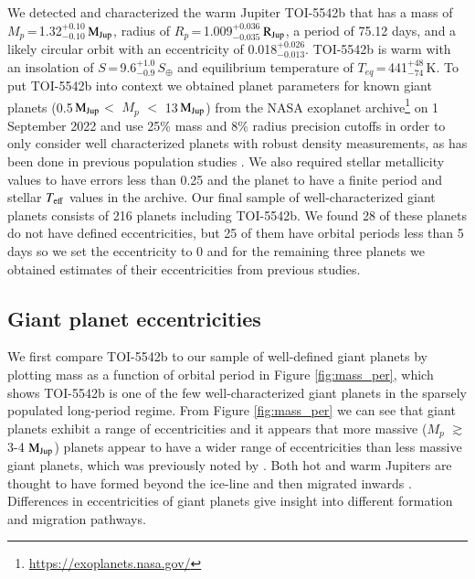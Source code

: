 \documentclass{aa}
\newcommand{\teff}{\ensuremath{T_{\rm eff}}\xspace}
\newcommand{\mjup}{\mbox{$\mathrm{M_{\rm Jup}}$}\xspace}
\newcommand{\rjup}{\mbox{$\mathrm{R_{\rm Jup}}$}\xspace}
\begin{document}
We detected and characterized the warm Jupiter TOI-5542b that has a mass of $M_p$\,=\,1.32$^{+0.10}_{-0.10}$\,\mjup, radius of $R_p$\,=\,1.009$^{+0.036}_{-0.035}$\,\rjup, a period of 75.12 days, and a likely circular orbit with an eccentricity of 0.018$^{+0.026}_{-0.013}$. TOI-5542b is warm with an insolation of $S$\,=\,9.6$^{+1.0}_{-0.9}$\,$S_{\oplus}$ and equilibrium temperature of $T_{eq}$\,=\,441$^{+48}_{-74}$\,K. To put TOI-5542b into context we obtained planet parameters for known giant planets (0.5\,\mjup $<$ $M_p$ $<$ 13\,\mjup) from the NASA exoplanet archive\footnote{\url{https://exoplanets.nasa.gov/}} on 1 September 2022 and use 25\% mass and 8\% radius precision cutoffs in order to only consider well characterized planets with robust density measurements, as has been done in previous population studies \citep[e.g.,][]{Otegi2020}. We also required stellar metallicity values to have errors less than 0.25 and the planet to have a finite period and stellar \teff values in the archive. Our final sample of well-characterized giant planets consists of 216 planets including TOI-5542b. We found 28 of these planets do not have defined eccentricities, but 25 of them have orbital periods less than 5 days so we set the eccentricity to 0 and for the remaining three planets we obtained estimates of their eccentricities from previous studies.

\subsection{Giant planet eccentricities}

We first compare TOI-5542b to our sample of well-defined giant planets by plotting mass as a function of orbital period in Figure \ref{fig:mass_per}, which shows TOI-5542b is one of the few well-characterized giant planets in the sparsely populated long-period regime. From Figure \ref{fig:mass_per} we can see that giant planets exhibit a range of eccentricities and it appears that more massive ($M_{p}$ $\gtrsim$ 3-4 \mjup) planets appear to have a wider range of eccentricities than less massive giant planets, which was previously noted by \citet{Ribas2007}. Both hot and warm Jupiters are thought to have formed beyond the ice-line and then migrated inwards \citep[e.g.,][]{Bodenheimer2000,Rafikov2006}. Differences in eccentricities of giant planets give insight into different formation and migration pathways. 
\end{document}
